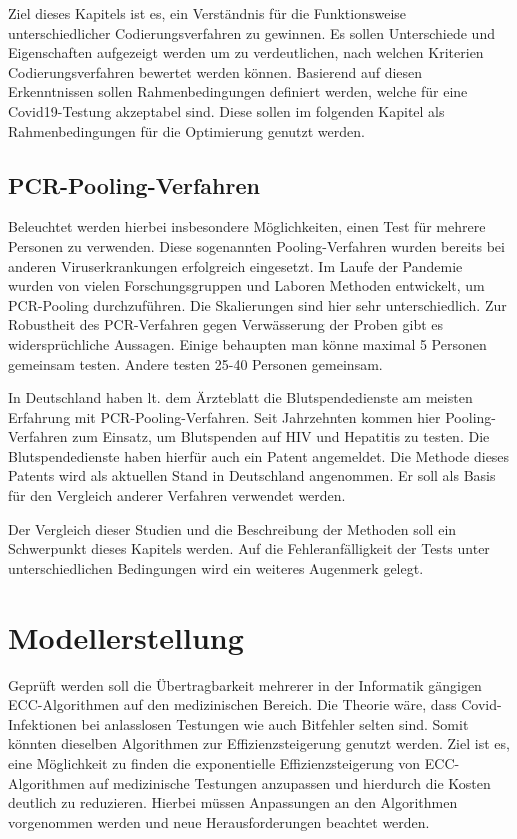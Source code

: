 Ziel dieses Kapitels ist es, ein Verständnis für die Funktionsweise unterschiedlicher Codierungsverfahren zu gewinnen.
Es sollen Unterschiede und Eigenschaften aufgezeigt werden um zu verdeutlichen, nach welchen Kriterien Codierungsverfahren bewertet werden können.
Basierend auf diesen Erkenntnissen sollen Rahmenbedingungen definiert werden, welche für eine Covid19-Testung akzeptabel sind.
Diese sollen im folgenden Kapitel als Rahmenbedingungen für die Optimierung genutzt werden.

\subsection{PCR-Pooling-Verfahren}
Beleuchtet werden hierbei insbesondere Möglichkeiten, einen Test für mehrere Personen zu verwenden.
Diese sogenannten Pooling-Verfahren wurden bereits bei anderen Viruserkrankungen erfolgreich eingesetzt.
\cite{Ärzteblatt}
Im Laufe der Pandemie wurden von vielen Forschungsgruppen und Laboren Methoden entwickelt, um PCR-Pooling durchzuführen.
Die Skalierungen sind hier sehr unterschiedlich.
Zur Robustheit des PCR-Verfahren gegen Verwässerung der Proben gibt es widersprüchliche Aussagen.
Einige behaupten man könne maximal 5 Personen gemeinsam testen.
\cite{Quelle}
Andere testen 25-40 Personen gemeinsam.
\cite{Quelle}

In Deutschland haben lt. dem Ärzteblatt die Blutspendedienste am meisten Erfahrung mit PCR-Pooling-Verfahren.
\cite{Ärzteblatt}
Seit Jahrzehnten kommen hier Pooling-Verfahren zum Einsatz, um Blutspenden auf HIV und Hepatitis zu testen.
Die Blutspendedienste haben hierfür auch ein Patent angemeldet.
\cite{Patent Blutspende}
Die Methode dieses Patents wird als aktuellen Stand in Deutschland angenommen.
Er soll als Basis für den Vergleich anderer Verfahren verwendet werden.

Der Vergleich dieser Studien und die Beschreibung der Methoden soll ein Schwerpunkt dieses Kapitels werden.
Auf die Fehleranfälligkeit der Tests unter unterschiedlichen Bedingungen wird ein weiteres Augenmerk gelegt.

\section{Modellerstellung}
Geprüft werden soll die Übertragbarkeit mehrerer in der Informatik gängigen ECC-Algorithmen auf den medizinischen Bereich.
Die Theorie wäre, dass Covid-Infektionen bei anlasslosen Testungen wie auch Bitfehler selten sind.
Somit könnten dieselben Algorithmen zur Effizienzsteigerung genutzt werden.
Ziel ist es, eine Möglichkeit zu finden die exponentielle Effizienzsteigerung von ECC-Algorithmen auf medizinische Testungen anzupassen und hierdurch die Kosten deutlich zu reduzieren.
Hierbei müssen Anpassungen an den Algorithmen vorgenommen werden und neue Herausforderungen beachtet werden.

